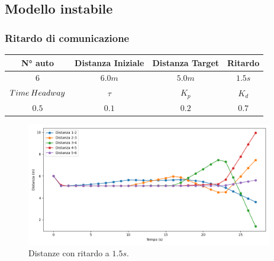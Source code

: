 \newpage



\subsection{Modello instabile}


\subsubsection{Ritardo di comunicazione}
\vspace*{\fill}
\begin{table}[h]
    \centering
    \begin{tabular}{|c|c|c|c|}
        \hline
        N° auto & Distanza Iniziale & Distanza Target & Ritardo \\
        \hline
        $6$ & $6.0 m$ & $5.0 m$ & $1.5 s$ \\
        \hline
        $Time\hspace{0.2em}Headway$ & $\tau$ & $K_p$ & $K_d$  \\
        \hline
        $0.5$ & $0.1$ & $0.2$ & $0.7$ \\
        \hline
    \end{tabular}
\end{table}

\begin{figure}[H]
    \includegraphics[width=0.96\textwidth]{images/5-experiment/delay/distance_1,5+.png}
    \caption{Distanze con ritardo a $1.5 s$.}
    \label{fig:1.5-delay-distance}
\end{figure}

